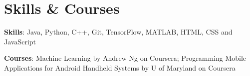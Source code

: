 \documentclass[letterpaper,11pt]{article}
\newcommand{\resumeSubHeadingListStart}{\begin{itemize}[leftmargin=*]}
\newcommand{\resumeSubHeadingListEnd}{\end{itemize}}
\begin{document}
\section{Skills \& Courses}
  \resumeSubHeadingListStart
    \item{
      \textbf{Skills}{: Java, Python, C++, Git, TensorFlow, MATLAB, HTML, CSS and JavaScript}
      \item
      \textbf{Courses}{: Machine Learning by Andrew Ng on Coursera; Programming Mobile Applications for Android Handheld Systems by U of Maryland on Coursera}
    }
  \resumeSubHeadingListEnd

\end{document}
